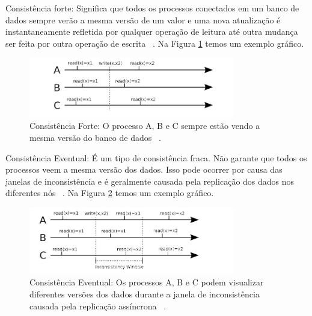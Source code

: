 Consistência forte: Significa que todos os processos conectados em um banco de dados sempre verão a mesma versão de um valor e uma nova atualização é instantaneamente refletida por qualquer operação de leitura até outra mudança ser feita por outra operação de escrita ~\cite{Orendanalysisand}. Na Figura \ref{fig:strongconsistency} temos um exemplo gráfico.

	\begin{figure}[!htbp]
		\begin{center}
			\includegraphics[width=0.8\textwidth]{strongconsistency}
		\end{center}
		\caption{Consistência Forte: O processo A, B e C sempre estão vendo a mesma versão do banco de dados ~\cite{Orendanalysisand}.}
		\label{fig:strongconsistency}
	\end{figure}

Consistência Eventual: É um tipo de consistência fraca. Não garante que todos os processos veem a mesma versão dos dados. Isso pode ocorrer por causa das janelas de inconsistência e é geralmente causada pela replicação dos dados nos diferentes nós ~\cite{Orendanalysisand}. Na Figura \ref{fig:eventualconsistency} temos um exemplo gráfico.

	\begin{figure}[!htbp]
		\begin{center}
			\includegraphics[width=0.8\textwidth]{eventualconsistency}
		\end{center}
		\caption{Consistência Eventual: Os processos A, B e C podem visualizar diferentes versões dos dados durante a janela de inconsistência causada pela replicação assíncrona ~\cite{Orendanalysisand}.}
		\label{fig:eventualconsistency}
	\end{figure}







